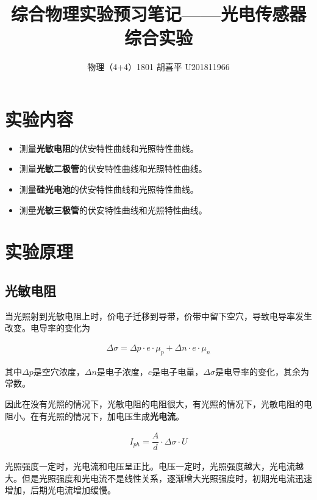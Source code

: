 \documentclass{article}
\author{物理（4+4）1801 \quad  胡喜平 \quad U201811966}
\affil{个人网站 https://hxp.plus/ \quad 电子邮件 hxp201406@gmail.com}
\title{综合物理实验预习笔记——光电传感器综合实验}
\begin{document}
\maketitle\thispagestyle{fancy}

\section{实验内容}

\begin{itemize}
\item 测量\textbf{光敏电阻}的伏安特性曲线和光照特性曲线。
\item 测量\textbf{光敏二极管}的伏安特性曲线和光照特性曲线。
\item 测量\textbf{硅光电池}的伏安特性曲线和光照特性曲线。
\item 测量\textbf{光敏三极管}的伏安特性曲线和光照特性曲线。
\end{itemize}

\section{实验原理}

\subsection{光敏电阻}

当光照射到光敏电阻上时，价电子迁移到导带，价带中留下空穴，导致电导率发生改变。电导率的变化为

\begin{equation*}
  \begin{aligned}
    \Delta \sigma = \Delta p \cdot e \cdot \mu_p + \Delta n \cdot e \cdot \mu_n
  \end{aligned}
\end{equation*}

其中$\Delta p$是空穴浓度，$\Delta n$是电子浓度，$e$是电子电量，$\Delta \sigma$是电导率的变化，其余为常数。

因此在没有光照的情况下，光敏电阻的电阻很大，有光照的情况下，光敏电阻的电阻小。在有光照的情况下，加电压生成\textbf{光电流}。

\begin{equation*}
  \begin{aligned}
    I_{ph} = \dfrac{A}{d} \cdot \Delta \sigma \cdot U 
  \end{aligned}
\end{equation*}

光照强度一定时，光电流和电压呈正比。电压一定时，光照强度越大，光电流越大。但是光照强度和光电流不是线性关系，逐渐增大光照强度时，初期光电流迅速增加，后期光电流增加缓慢。
\end{document}
